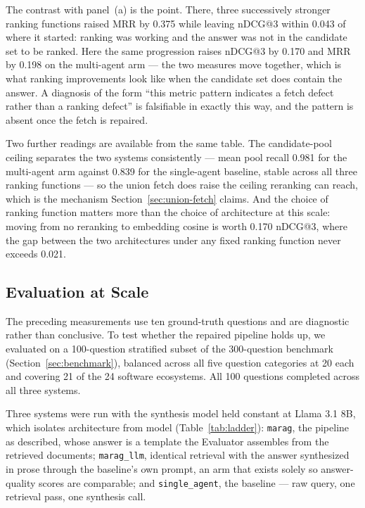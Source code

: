 \documentclass[acmsmall,review,anonymous,screen]{acmart}
\begin{document}
The contrast with panel~(a) is the point. There, three successively stronger
ranking functions raised MRR by 0.375 while leaving nDCG@3 within 0.043 of where
it started: ranking was working and the answer was not in the candidate set to be
ranked. Here the same progression raises nDCG@3 by 0.170 and MRR by 0.198 on the
multi-agent arm --- the two measures move together, which is what ranking
improvements look like when the candidate set does contain the answer. A
diagnosis of the form ``this metric pattern indicates a fetch defect rather than
a ranking defect'' is falsifiable in exactly this way, and the pattern is absent
once the fetch is repaired.

Two further readings are available from the same table. The candidate-pool
ceiling separates the two systems consistently --- mean pool recall 0.981 for the
multi-agent arm against 0.839 for the single-agent baseline, stable across all
three ranking functions --- so the union fetch does raise the ceiling reranking
can reach, which is the mechanism Section~\ref{sec:union-fetch} claims. And the
choice of ranking function matters more than the choice of architecture at this
scale: moving from no reranking to embedding cosine is worth 0.170 nDCG@3, where
the gap between the two architectures under any fixed ranking function never
exceeds 0.021.

\subsection{Evaluation at Scale}\label{sec:scaled-eval}

The preceding measurements use ten ground-truth questions and are diagnostic
rather than conclusive. To test whether the repaired pipeline holds up, we
evaluated on a 100-question stratified subset of the 300-question benchmark
(Section~\ref{sec:benchmark}), balanced across all five question categories at 20
each and covering 21 of the 24 software ecosystems. All 100 questions completed
across all three systems.

Three systems were run with the synthesis model held constant at Llama 3.1 8B,
which isolates architecture from model (Table~\ref{tab:ladder}):
\texttt{marag}, the pipeline as described, whose answer is a template the
Evaluator assembles from the retrieved documents; \texttt{marag\_llm}, identical
retrieval with the answer synthesized in prose through the baseline's own
prompt, an arm that exists solely so answer-quality scores are comparable; and
\texttt{single\_agent}, the baseline --- raw query, one retrieval pass, one
synthesis call.
\end{document}
